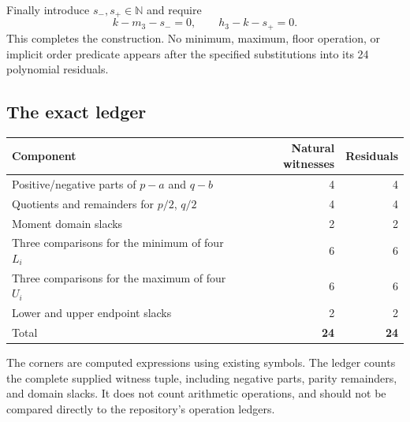 \documentclass[11pt,letterpaper]{article}
\theoremstyle{definition}
\theoremstyle{remark}
\newcommand{\N}{\mathbb N}
\begin{document}
Finally introduce $s_-,s_+\in\N$ and require
\begin{equation}\label{gts:po:eq:endpointslacks}
 k-m_3-s_-=0,\qquad h_3-k-s_+=0.
\end{equation}
This completes the construction. No minimum, maximum, floor operation, or implicit order predicate appears after the specified substitutions into its 24 polynomial residuals.

\subsection{The exact ledger}
\begin{center}
\begin{tabular}{p{.54\linewidth}rr}
\toprule
Component & Natural witnesses & Residuals\\
\midrule
Positive/negative parts of $p-a$ and $q-b$ &4&4\\
Quotients and remainders for $p/2$, $q/2$ &4&4\\
Moment domain slacks &2&2\\
Three comparisons for the minimum of four $L_i$ &6&6\\
Three comparisons for the maximum of four $U_i$ &6&6\\
Lower and upper endpoint slacks &2&2\\
\midrule
Total &\textbf{24}&\textbf{24}\\
\bottomrule
\end{tabular}
\end{center}
The corners are computed expressions using existing symbols. The ledger counts the complete supplied witness tuple, including negative parts, parity remainders, and domain slacks. It does not count arithmetic operations, and should not be compared directly to the repository's operation ledgers.
\end{document}
